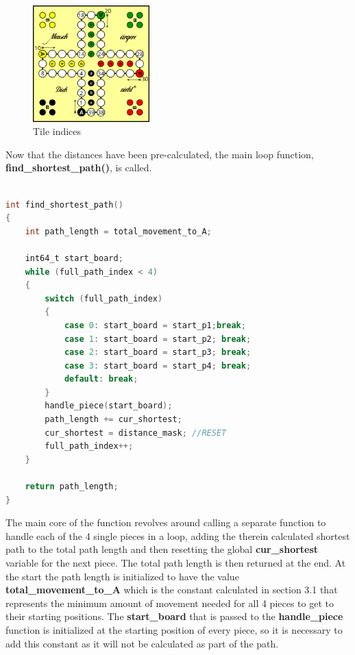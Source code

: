 \documentclass[12pt]{article}
\begin{document}
\begin{figure}[htbp]
    \centering
    \includegraphics[width=0.4\textwidth]{images/Figure7}
    \caption{Tile indices}
    \label{fig:tile-indices}
\end{figure}

\newpage

Now that the distances have been pre-calculated, the main loop function, \textbf{find\_shortest\_path()}, is called.

\begin{lstlisting}[language=C, caption={Find shortest path}, label={lst:find-shortest-path}]

int find_shortest_path()
{
    int path_length = total_movement_to_A;

    int64_t start_board;
    while (full_path_index < 4)
    {
        switch (full_path_index)
        {
            case 0: start_board = start_p1;break;
            case 1: start_board = start_p2; break;
            case 2: start_board = start_p3; break;
            case 3: start_board = start_p4; break;
            default: break;
        }
        handle_piece(start_board);
        path_length += cur_shortest;
        cur_shortest = distance_mask; //RESET
        full_path_index++;
    }

    return path_length;
}
\end{lstlisting}

The main core of the function revolves around calling a separate function to handle each of the 4 single pieces in a loop, adding the therein calculated shortest path to the total path length and then resetting the global \textbf{cur\_shortest} variable for the next piece. The total path length is then returned at the end. At the start the path length is initialized to have the value \textbf{total\_movement\_to\_A} which is the constant calculated in section 3.1 that represents the minimum amount of movement needed for all 4 pieces to get to their starting positions. The \textbf{start\_board} that is passed to the \textbf{handle\_piece} function is initialized at the starting position of every piece, so it is necessary to add this constant as it will not be calculated as part of the path.
\end{document}
